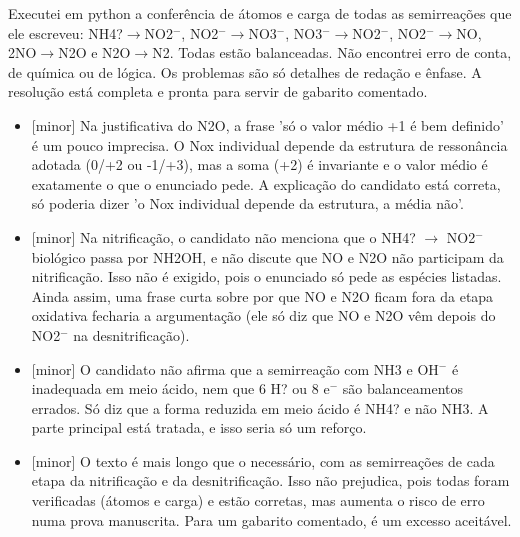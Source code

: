\documentclass{article}%
\begin{document}
Executei em python a conferência de átomos e carga de todas as semirreações que ele escreveu: NH4?$\to$NO2$^{-}$, NO2$^{-}$$\to$NO3$^{-}$, NO3$^{-}$$\to$NO2$^{-}$, NO2$^{-}$$\to$NO, 2NO$\to$N2O e N2O$\to$N2. Todas estão balanceadas.\newline%
\newline%
Não encontrei erro de conta, de química ou de lógica. Os problemas são só detalhes de redação e ênfase. A resolução está completa e pronta para servir de gabarito comentado.%
\begin{itemize}%
\item%
{[}minor{]} Na justificativa do N2O, a frase 'só o valor médio +1 é bem definido' é um pouco imprecisa. O Nox individual depende da estrutura de ressonância adotada (0/+2 ou -1/+3), mas a soma (+2) é invariante e o valor médio é exatamente o que o enunciado pede. A explicação do candidato está correta, só poderia dizer 'o Nox individual depende da estrutura, a média não'.%
\item%
{[}minor{]} Na nitrificação, o candidato não menciona que o NH4? $\to$ NO2$^{-}$ biológico passa por NH2OH, e não discute que NO e N2O não participam da nitrificação. Isso não é exigido, pois o enunciado só pede as espécies listadas. Ainda assim, uma frase curta sobre por que NO e N2O ficam fora da etapa oxidativa fecharia a argumentação (ele só diz que NO e N2O vêm depois do NO2$^{-}$ na desnitrificação).%
\item%
{[}minor{]} O candidato não afirma que a semirreação com NH3 e OH$^{-}$ é inadequada em meio ácido, nem que 6 H? ou 8 e$^{-}$ são balanceamentos errados. Só diz que a forma reduzida em meio ácido é NH4? e não NH3. A parte principal está tratada, e isso seria só um reforço.%
\item%
{[}minor{]} O texto é mais longo que o necessário, com as semirreações de cada etapa da nitrificação e da desnitrificação. Isso não prejudica, pois todas foram verificadas (átomos e carga) e estão corretas, mas aumenta o risco de erro numa prova manuscrita. Para um gabarito comentado, é um excesso aceitável.%
\end{itemize}%
\end{document}
